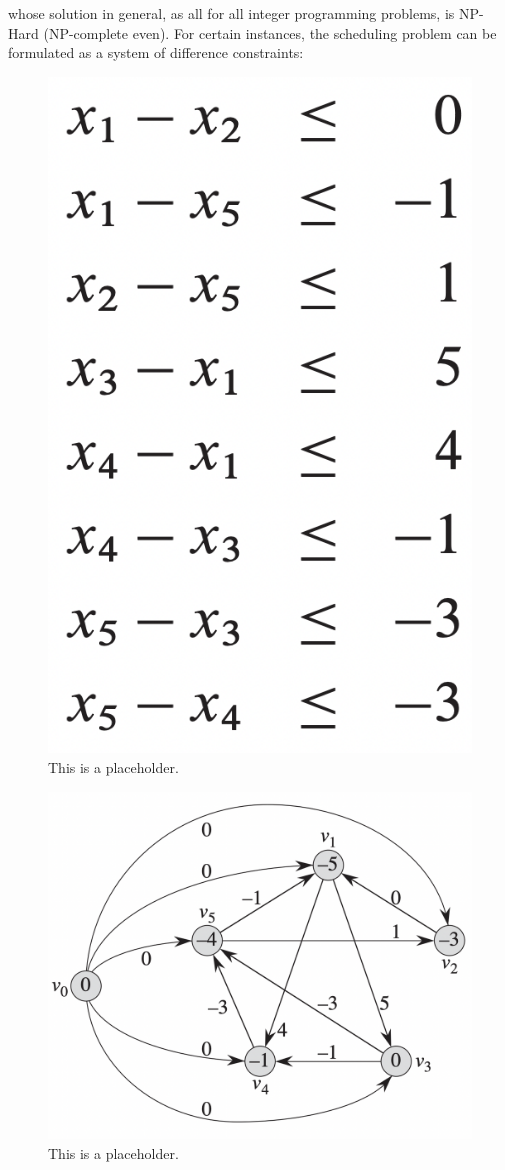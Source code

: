 whose solution in general, as all for all integer programming problems, is NP-Hard (NP-complete even).
For certain instances, the scheduling problem can be formulated as a system of difference constraints:
\begin{figure}[H]
	\includegraphics[height=\columnwidth]{figures/sdc_constraints}
	\caption{This is a placeholder.}
\end{figure}
\begin{figure}
	\includegraphics[width=\columnwidth]{figures/sdc_graph}
	\caption{This is a placeholder.}
\end{figure}

